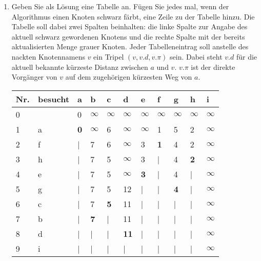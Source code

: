 \documentclass{lehramt-informatik-aufgabe}
\begin{document}
\begin{enumerate}
\begin{enumerate}


\item Geben Sie als Lösung eine Tabelle an. Fügen Sie jedes mal, wenn
der Algorithmus einen Knoten schwarz färbt, eine Zeile zu der Tabelle
hinzu. Die Tabelle soll dabei zwei Spalten beinhalten: die linke Spalte
zur Angabe des aktuell schwarz gewordenen Knotens und die rechte Spalte
mit der bereits aktualisierten Menge grauer Knoten. Jeder
Tabelleneintrag soll anstelle des nackten Knotennamens $v$ ein Tripel
$(v, v.d, v.\pi)$ sein. Dabei steht $v.d$ für die aktuell bekannte
kürzeste Distanz zwischen $a$ und $v$. $v.\pi$ ist der direkte Vorgänger
von $v$ auf dem zugehörigen kürzesten Weg von $a$.

\begin{liAntwort}
\begin{tabular}{lllllllllll}
\bf{Nr.} & \bf{besucht} & \bf{a} & \bf{b} & \bf{c} & \bf{d} & \bf{e} & \bf{f} & \bf{g} & \bf{h} & \bf{i} \\
\hline
0 &   & 0 & $\infty$ & $\infty$ & $\infty$ & $\infty$ & $\infty$ & $\infty$ & $\infty$ & $\infty$ \\
1 & a & \bf{0} & $\infty$ & 6 & $\infty$ & $\infty$ & 1 & 5 & 2 & $\infty$ \\
2 & f & | & 7 & 6 & $\infty$ & 3 & \bf{1} & 4 & 2 & $\infty$ \\
3 & h & | & 7 & 5 & $\infty$ & 3 & | & 4 & \bf{2} & $\infty$ \\
4 & e & | & 7 & 5 & $\infty$ & \bf{3} & | & 4 & | & $\infty$ \\
5 & g & | & 7 & 5 & 12 & | & | & \bf{4} & | & $\infty$ \\
6 & c & | & 7 & \bf{5} & 11 & | & | & | & | & $\infty$ \\
7 & b & | & \bf{7} & | & 11 & | & | & | & | & $\infty$ \\
8 & d & | & | & | & \bf{11} & | & | & | & | & $\infty$ \\
9 & i & | & | & | & | & | & | & | & | & $\infty$ \\
\end{tabular}


\end{liAntwort}
\end{enumerate}
\end{enumerate}
\end{document}
